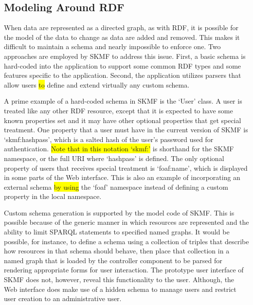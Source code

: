 \subsection{Modeling Around RDF}
\label{method:orm}

When data are represented as a directed graph, as with RDF, it is possible for the model of the data to change as data are added and removed. This makes it difficult to maintain a schema and nearly impossible to enforce one. Two approaches are employed by SKMF to address this issue. First, a basic schema is hard-coded into the application to support some common RDF types and some features specific to the application. Second, the application utilizes parsers that allow users
\colorbox{yellow}{to}
define and extend virtually any custom schema.

A prime example of a hard-coded schema in SKMF is the `User' class. A user is treated like any other RDF resource, except that it is expected to have some known properties set and it may have other optional properties that get special treatment. One property that a user must have in the current version of SKMF is `skmf:hashpass', which is a salted hash of the user's password used for authentication.
\colorbox{yellow}{Note that in this notation `skmf:'}
is shorthand for the SKMF namespace, or the full URI where `hashpass' is defined. The only optional property of users that receives special treatment is `foaf:name', which is displayed in some parts of the Web interface. This is also an example of incorporating an external schema
\colorbox{yellow}{by using}
the `foaf' namespace
\cite{foaf}
instead of defining a custom property in the local namespace.

Custom schema generation is supported by the model code of SKMF. This is possible because of the generic manner in which resources are represented and the ability to limit SPARQL statements to specified named graphs. It would be possible, for instance, to define a schema using a collection of triples that describe how resources in that schema should behave, then place that collection in a named graph that is loaded by the controller component to be parsed for rendering appropriate forms for user interaction. The prototype user interface of SKMF does not, however, reveal this functionality to the user. Although, the Web interface does make use of a hidden schema to manage users and restrict user creation to an administrative user.

